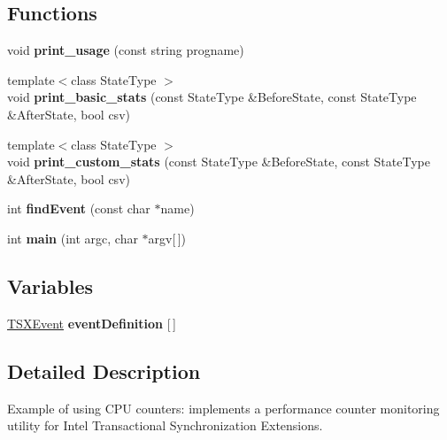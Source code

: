 \subsection*{Functions}
\begin{DoxyCompactItemize}
\item 
\mbox{\label{pcm-tsx_8cpp_a4e43544978d9afb2faf08dce11cab70c}} 
void {\bfseries print\+\_\+usage} (const string progname)
\item 
\mbox{\label{pcm-tsx_8cpp_a5ded5e5cf069617e10262bf55eef2755}} 
{\footnotesize template$<$class State\+Type $>$ }\\void {\bfseries print\+\_\+basic\+\_\+stats} (const State\+Type \&Before\+State, const State\+Type \&After\+State, bool csv)
\item 
\mbox{\label{pcm-tsx_8cpp_a50e3da3c8c576ec27ac14afcb226717f}} 
{\footnotesize template$<$class State\+Type $>$ }\\void {\bfseries print\+\_\+custom\+\_\+stats} (const State\+Type \&Before\+State, const State\+Type \&After\+State, bool csv)
\item 
\mbox{\label{pcm-tsx_8cpp_a6c01bd81dd058f924885a7ba93c94dcc}} 
int {\bfseries find\+Event} (const char $\ast$name)
\item 
\mbox{\label{pcm-tsx_8cpp_a0ddf1224851353fc92bfbff6f499fa97}} 
int {\bfseries main} (int argc, char $\ast$argv\mbox{[}$\,$\mbox{]})
\end{DoxyCompactItemize}
\subsection*{Variables}
\begin{DoxyCompactItemize}
\item 
\mbox{\label{pcm-tsx_8cpp_af6afa6575f1849ca84ef80ff04ba6e0a}} 
\mbox{\hyperlink{struct_t_s_x_event}{T\+S\+X\+Event}} {\bfseries event\+Definition} \mbox{[}$\,$\mbox{]}
\end{DoxyCompactItemize}


\subsection{Detailed Description}
Example of using C\+PU counters\+: implements a performance counter monitoring utility for Intel Transactional Synchronization Extensions. 

